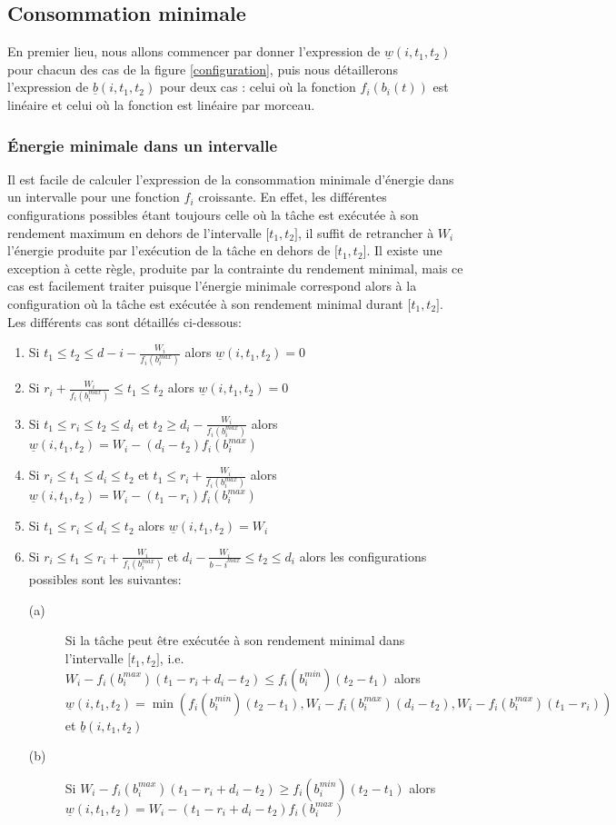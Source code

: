 \documentclass{report}
\newcommand{\bb}{\underline{b}(i,t_1,t_2)}
\newcommand{\wb}{\underline{w}(i,t_1,t_2)}
\begin{document}
\subsection{Consommation minimale}

En premier lieu, nous allons commencer par donner l'expression de $\wb$ pour chacun des cas de la figure \ref{configuration}, puis nous détaillerons l'expression de $\bb$ pour deux cas : celui où la fonction $f_i(b_i(t))$ est linéaire et celui où la fonction est linéaire par morceau. 

\subsubsection{{\'E}nergie minimale dans un intervalle}
	
Il est facile de calculer l'expression de la consommation minimale d'énergie dans un intervalle pour une fonction $f_i$ croissante. En effet, les différentes configurations possibles étant toujours celle où la tâche est exécutée à son rendement maximum en dehors de l'intervalle ${[}t_1,t_2{]}$, il suffit de retrancher à $W_i$ l'énergie produite par l'exécution de la tâche en dehors de ${[}t_1,t_2{]}$. Il existe une exception à cette règle, produite par la contrainte du rendement minimal, mais ce cas est facilement traiter puisque l'énergie minimale correspond alors à la configuration où la tâche est exécutée à son rendement minimal durant ${[}t_1,t_2{]}$. Les différents cas sont détaillés ci-dessous:
	
\begin{enumerate}
\item Si $t_1 \le t_2 \le d-i - \frac{W_i}{f_i(b_i^{max})}$ alors $\wb=0$
\item Si $r_i+\frac{W_i}{f_i(b_i^{max})} \le t_1 \le t_2$ alors $\wb=0$
\item Si $t_1 \le r_i \le t_2 \le d_i$ et $t_2 \ge d_i - \frac{W_i}{f_i(b_i^{max})}$ alors $\wb=W_i-(d_i-t_2)f_i(b_i^{max})$
\item Si $r_i \le t_1 \le d_i \le t_2$ et $t_1 \le r_i+ \frac{W_i}{f_i(b_i^{max})}$ alors $\wb=W_i- (t_1-r_i)f_i(b_i^{max})$
\item Si $t_1 \le r_i \le d_i \le t_2$ alors $\wb=W_i$ 
\item Si $r_i \le t_1 \le r_i + \frac{W_i}{f_i(b_i^{max})}$ et $d_i-\frac{W_i}{b-i^{max}} \le t_2 \le d_i$ alors les configurations possibles sont les suivantes:
	
  \begin{description}
  \item[(a)] Si la tâche peut être exécutée à son rendement minimal dans l'intervalle ${[}t_1,t_2{]}$, i.e. $W_i -f_i(b_i^{max})(t_1-r_i+d_i-t_2) \le f_i(b_i^{min})(t_2-t_1)$ alors \\
		$\wb=\min {(f_i(b_i^{min})(t_2-t_1),W_i - f_i(b_i^{max})(d_i-t_2),W_i - f_i(b_i^{max})(t_1-r_i))}$ et $\bb$
		
  \item[(b)] Si $W_i -f_i(b_i^{max})(t_1-r_i+d_i-t_2) \ge f_i(b_i^{min})(t_2-t_1)$ alors $\wb=W_i- (t_1-r_i+d_i-t_2)f_i(b_i^{max})$ 
  \end{description}
\end{enumerate}
	
\end{document}
